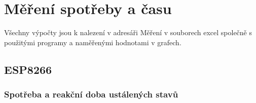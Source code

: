 \documentclass[a4paper, 12pt]{report}
\begin{document}


    \chapter{Měření spotřeby a času}
    Všechny výpočty jsou k nalezení v adresáři Měření v souborech excel společně s použitými programy a naměřenými hodnotami v grafech.


    \section{ESP8266}

    \subsection{Spotřeba a reakční doba ustálených stavů}
\end{document}
